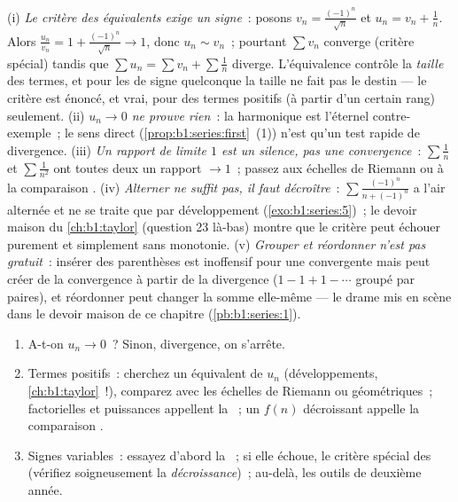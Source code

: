 \begin{remark}
(i) \emph{Le critère des équivalents exige un signe}~: posons $v_n =
\frac{(-1)^n}{\sqrt n}$ et $u_n = v_n + \frac1n$. Alors
$\frac{u_n}{v_n} = 1 + \frac{(-1)^n}{\sqrt n} \to 1$, donc $u_n
\sim v_n$~; pourtant $\sum v_n$ converge (critère spécial) tandis
que $\sum u_n = \sum v_n + \sum \frac1n$ diverge. L'équivalence
contrôle la \emph{taille} des termes, et pour les  de signe
quelconque la taille ne fait pas le destin --- le critère est
énoncé, et vrai, pour des termes positifs (à partir d'un certain
rang) seulement. (ii) \emph{$u_n \to 0$ ne prouve rien}~: la 
harmonique est l'éternel contre-exemple~; le sens direct
(\cref{prop:b1:series:first}~(1)) n'est qu'un test rapide de
divergence. (iii) \emph{Un rapport de limite $1$ est un silence,
pas une convergence}~: $\sum\frac1n$ et $\sum\frac{1}{n^2}$ ont
toutes deux un rapport $\to 1$~; passez aux échelles de Riemann ou
à la comparaison . (iv) \emph{Alterner ne suffit pas,
il faut décroître}~: $\sum \frac{(-1)^n}{n + (-1)^n}$ a l'air
alternée et ne se traite que par développement
(\cref{exo:b1:series:5})~; le devoir maison du \cref{ch:b1:taylor}
(question 23 là-bas) montre que le critère peut échouer purement et
simplement sans monotonie. (v) \emph{Grouper et réordonner n'est pas
gratuit}~: insérer des parenthèses est inoffensif pour une 
convergente mais peut créer de la convergence à partir de la
divergence ($1 - 1 + 1 - \cdots$ groupé par paires), et réordonner
peut changer la somme elle-même --- le drame mis en scène dans le
devoir maison de ce chapitre (\cref{pb:b1:series:1}).
\end{remark}

\begin{method}\label{met:b1:series:decide}
\begin{enumerate}
  \item A-t-on $u_n \to 0$~? Sinon, divergence, on s'arrête.
  \item Termes positifs~: cherchez un équivalent de $u_n$
        (développements, \cref{ch:b1:taylor}~!), comparez avec les
        échelles de Riemann ou géométriques~; factorielles et
        puissances appellent la ~; un $f(n)$
        décroissant appelle la comparaison .
  \item Signes variables~: essayez d'abord la ~;
        si elle échoue, le critère spécial des 
        (vérifiez soigneusement la \emph{décroissance})~; au-delà,
        les outils de deuxième année.
\end{enumerate}
\end{method}

